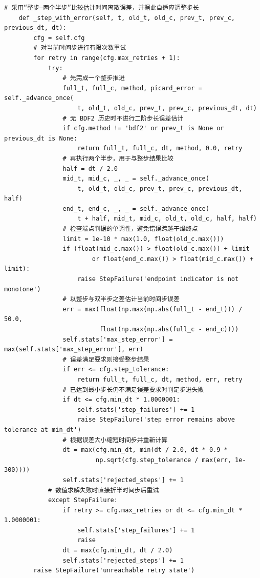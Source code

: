 \begin{Verbatim}[fontsize=\scriptsize,breaklines=true,breakanywhere=true]
    # 采用“整步—两个半步”比较估计时间离散误差，并据此自适应调整步长
    def _step_with_error(self, t, old_t, old_c, prev_t, prev_c, previous_dt, dt):
        cfg = self.cfg
        # 对当前时间步进行有限次数重试
        for retry in range(cfg.max_retries + 1):
            try:
                # 先完成一个整步推进
                full_t, full_c, method, picard_error = self._advance_once(
                    t, old_t, old_c, prev_t, prev_c, previous_dt, dt)
                # 无 BDF2 历史时不进行二阶步长误差估计
                if cfg.method != 'bdf2' or prev_t is None or previous_dt is None:
                    return full_t, full_c, dt, method, 0.0, retry
                # 再执行两个半步，用于与整步结果比较
                half = dt / 2.0
                mid_t, mid_c, _, _ = self._advance_once(
                    t, old_t, old_c, prev_t, prev_c, previous_dt, half)
                end_t, end_c, _, _ = self._advance_once(
                    t + half, mid_t, mid_c, old_t, old_c, half, half)
                # 检查端点判据的单调性，避免错误跨越干燥终点
                limit = 1e-10 * max(1.0, float(old_c.max()))
                if (float(mid_c.max()) > float(old_c.max()) + limit
                        or float(end_c.max()) > float(mid_c.max()) + limit):
                    raise StepFailure('endpoint indicator is not monotone')
                # 以整步与双半步之差估计当前时间步误差
                err = max(float(np.max(np.abs(full_t - end_t))) / 50.0,
                          float(np.max(np.abs(full_c - end_c))))
                self.stats['max_step_error'] = max(self.stats['max_step_error'], err)
                # 误差满足要求则接受整步结果
                if err <= cfg.step_tolerance:
                    return full_t, full_c, dt, method, err, retry
                # 已达到最小步长仍不满足误差要求时判定步进失败
                if dt <= cfg.min_dt * 1.0000001:
                    self.stats['step_failures'] += 1
                    raise StepFailure('step error remains above tolerance at min_dt')
                # 根据误差大小缩短时间步并重新计算
                dt = max(cfg.min_dt, min(dt / 2.0, dt * 0.9 *
                         np.sqrt(cfg.step_tolerance / max(err, 1e-300))))
                self.stats['rejected_steps'] += 1
            # 数值求解失败时直接折半时间步后重试
            except StepFailure:
                if retry >= cfg.max_retries or dt <= cfg.min_dt * 1.0000001:
                    self.stats['step_failures'] += 1
                    raise
                dt = max(cfg.min_dt, dt / 2.0)
                self.stats['rejected_steps'] += 1
        raise StepFailure('unreachable retry state')



\end{Verbatim}
